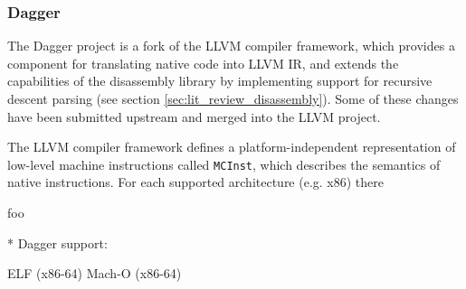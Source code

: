 
\subsubsection{Dagger}

The Dagger project is a fork of the LLVM compiler framework, which provides a component for translating native code into LLVM IR, and extends the capabilities of the disassembly library by implementing support for recursive descent parsing (see section \ref{sec:lit_review_disassembly}). Some of these changes have been submitted upstream and merged into the LLVM project.

The LLVM compiler framework defines a platform-independent representation of low-level machine instructions called \texttt{MCInst}, which describes the semantics of native instructions. For each supported architecture (e.g. x86) there

foo \cite{dagger}


* Dagger support:

ELF (x86-64)
Mach-O (x86-64)
